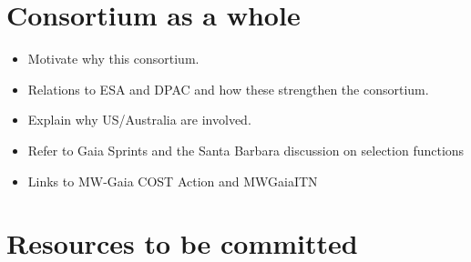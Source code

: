\makemilestoneslist


\makerisklist

\section{Consortium as a whole}
\label{sec:consortium}

\begin{itemize}
    \item Motivate why this consortium.
    \item Relations to ESA and DPAC and how these strengthen the consortium.
    \item Explain why US/Australia are involved.
    \item Refer to Gaia Sprints and the Santa Barbara discussion on selection functions
    \item Links to MW-Gaia COST Action and MWGaiaITN
\end{itemize}

\section{Resources to be committed}
\label{sec:resources}

\makesummaryofefforttable


\makecoststable

